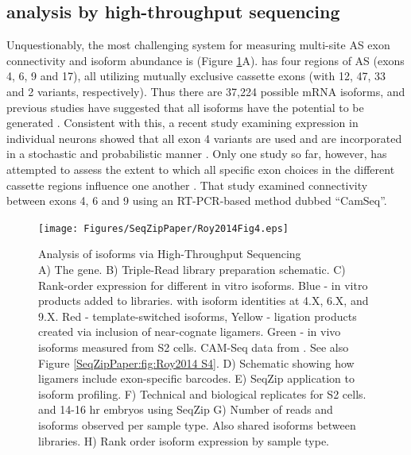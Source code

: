 	\subsection{\dscam{} analysis by high-throughput sequencing}\label{SeqZipPaper:subsec:Dscam SeqZip Controls}

		Unquestionably, the most challenging system for measuring multi-site AS exon connectivity and isoform abundance is \dscam{} (Figure \ref{SeqZipPaper:fig:Roy2014 F4}A). \dscam{} has four regions of AS (exons 4, 6, 9 and 17), all utilizing mutually exclusive cassette exons (with 12, 47, 33 and 2 variants, respectively). Thus there are 37,224 possible \dscam{} mRNA isoforms, and previous studies have suggested that all isoforms have the potential to be generated \citep{Neves2004,Zhan2004,Sun2013}. Consistent with this, a recent study examining \dscam{} expression in individual neurons showed that all exon 4 variants are used and are incorporated in a stochastic and probabilistic manner \citep{Miura2013b}. Only one study so far, however, has attempted to assess the extent to which all specific exon choices in the different cassette regions influence one another \citep{Sun2013}. That study examined connectivity between exons 4, 6 and 9 using an RT-PCR-based method dubbed ``CamSeq''.

		\begin{figure} %
			\centering 
			\texttt{[image: Figures/SeqZipPaper/Roy2014Fig4.eps]}
			\caption[Analysis of \dsacm{} isoforms via High-Throughput Sequencing]
			{ 
				Analysis of \dscam{} isoforms via High-Throughput Sequencing\\
				A) The \dscam{} gene. B) Triple-Read library preparation schematic. C) Rank-order expression for different in vitro \dscam{} isoforms. Blue - in vitro products added to libraries. with isoform identities at 4.X, 6.X, and 9.X. Red - template-switched isoforms, Yellow - ligation products created via inclusion of near-cognate ligamers. Green - in vivo isoforms measured from S2 cells. CAM-Seq data from \citep{Sun2013}. See also Figure \ref{SeqZipPaper:fig:Roy2014 S4}. D) Schematic showing how ligamers include exon-specific barcodes. E) SeqZip application to \dscam{} isoform profiling. F) Technical and biological replicates for S2 cells. and 14-16 hr embryos using SeqZip G) Number of reads and isoforms observed per sample type. Also shared isoforms between libraries. H) Rank order isoform expression by sample type.
				}
			\label{SeqZipPaper:fig:Roy2014 F4}
			\end{figure}

